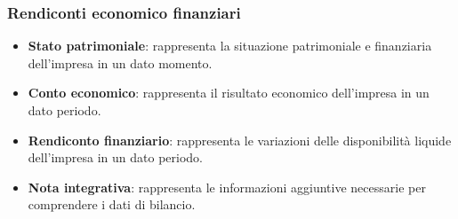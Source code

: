 \documentclass[a4paper,10pt]{article}
\begin{document}
\subsubsection{Rendiconti economico finanziari}
\begin{itemize}
    \item \textbf{Stato patrimoniale}: rappresenta la situazione patrimoniale e finanziaria dell'impresa in un dato momento.
    \item \textbf{Conto economico}: rappresenta il risultato economico dell'impresa in un dato periodo.
    \item \textbf{Rendiconto finanziario}: rappresenta le variazioni delle disponibilità liquide dell'impresa in un dato periodo.
    \item \textbf{Nota integrativa}: rappresenta le informazioni aggiuntive necessarie per comprendere i dati di bilancio.
\end{itemize}
\end{document}
